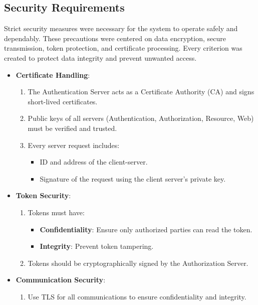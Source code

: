 \documentclass[10pt]{article}
\begin{document}
\subsection{Security Requirements}

Strict security measures were necessary for the system to operate safely and dependably. These precautions were centered on data encryption, secure transmission, token protection, and certificate processing. Every criterion was created to protect data integrity and prevent unwanted access.

\begin{itemize}
    \item \textbf{Certificate Handling}:
        \begin{enumerate}
            \item The Authentication Server acts as a Certificate Authority (CA) and signs short-lived certificates.
            \item Public keys of all servers (Authentication, Authorization, Resource, Web) must be verified and trusted.
            \item Every server request includes:
                \begin{itemize}
                    \item ID and address of the client-server.
                    \item Signature of the request using the client server’s private key.
                \end{itemize}
        \end{enumerate}
    \item \textbf{Token Security}:
        \begin{enumerate}
            \item Tokens must have:
                \begin{itemize}
                    \item \textbf{Confidentiality}: Ensure only authorized parties can read the token.
                    \item \textbf{Integrity}: Prevent token tampering.
                \end{itemize}
            \item Tokens should be cryptographically signed by the Authorization Server.
        \end{enumerate}
    \item \textbf{Communication Security}:
        \begin{enumerate}
            \item Use TLS for all communications to ensure confidentiality and integrity.

\end{enumerate}
\end{itemize}
\end{document}
